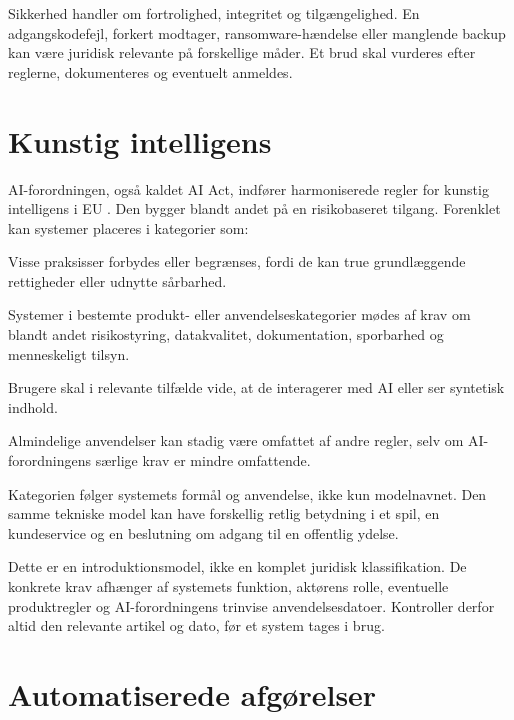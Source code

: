 Sikkerhed handler om fortrolighed, integritet og tilgængelighed. En adgangskodefejl, forkert modtager, ransomware-hændelse eller manglende backup kan være juridisk relevante på forskellige måder. Et brud skal vurderes efter reglerne, dokumenteres og eventuelt anmeldes.

\section{Kunstig intelligens}

AI-forordningen, også kaldet AI Act, indfører harmoniserede regler for kunstig intelligens i EU \citep{ai-act}. Den bygger blandt andet på en risikobaseret tilgang. Forenklet kan systemer placeres i kategorier som:

\begin{description}[style=nextline,leftmargin=0pt,labelindent=0pt]
  \item[Uacceptabel risiko] Visse praksisser forbydes eller begrænses, fordi de kan true grundlæggende rettigheder eller udnytte sårbarhed.
  \item[Høj risiko] Systemer i bestemte produkt- eller anvendelseskategorier mødes af krav om blandt andet risikostyring, datakvalitet, dokumentation, sporbarhed og menneskeligt tilsyn.
  \item[Begrænset eller særlig gennemsigtighed] Brugere skal i relevante tilfælde vide, at de interagerer med AI eller ser syntetisk indhold.
  \item[Minimal eller ingen særlig risiko] Almindelige anvendelser kan stadig være omfattet af andre regler, selv om AI-forordningens særlige krav er mindre omfattende.
\end{description}

Kategorien følger systemets formål og anvendelse, ikke kun modelnavnet. Den samme tekniske model kan have forskellig retlig betydning i et spil, en kundeservice og en beslutning om adgang til en offentlig ydelse.

Dette er en introduktionsmodel, ikke en komplet juridisk klassifikation. De konkrete krav afhænger af systemets funktion, aktørens rolle, eventuelle produktregler og AI-forordningens trinvise anvendelsesdatoer. Kontroller derfor altid den relevante artikel og dato, før et system tages i brug.

\section{Automatiserede afgørelser}

